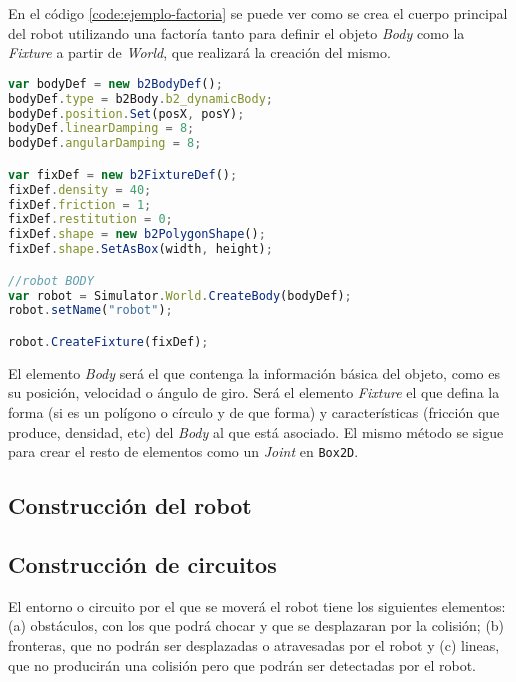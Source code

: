 En el código \ref{code:ejemplo-factoria} se puede ver como se crea el cuerpo principal del robot utilizando una factoría tanto para definir el objeto \emph{Body} como la \emph{Fixture} a partir de \emph{World}, que realizará la creación del mismo.

\begin{lstlisting}[language={Javascript},label={code:ejemplo-factoria}, caption={Creación del cuerpo principal del robot utilizando la librería Box2dweb.}]
var bodyDef = new b2BodyDef();
bodyDef.type = b2Body.b2_dynamicBody;
bodyDef.position.Set(posX, posY);
bodyDef.linearDamping = 8;
bodyDef.angularDamping = 8;

var fixDef = new b2FixtureDef();
fixDef.density = 40;
fixDef.friction = 1;
fixDef.restitution = 0;
fixDef.shape = new b2PolygonShape();
fixDef.shape.SetAsBox(width, height);

//robot BODY
var robot = Simulator.World.CreateBody(bodyDef);
robot.setName("robot");

robot.CreateFixture(fixDef);
\end{lstlisting}


El elemento \emph{Body} será el que contenga la información básica del objeto, como es su posición, velocidad o ángulo de giro. Será el elemento \emph{Fixture} el que defina la forma (si es un polígono o círculo y de que forma) y características (fricción que produce, densidad, etc) del \emph{Body} al que está asociado. El mismo método se sigue para crear el resto de elementos como un \emph{Joint} en \texttt{Box2D}.







\subsection{Construcción del robot}
\label{sec:contruccion-robot}

\subsection{Construcción de circuitos}
\label{sec:construccion-circuitos}


El entorno o circuito por el que se moverá el robot tiene los siguientes elementos: (a) obstáculos, con los que podrá chocar y que se desplazaran por la colisión; (b) fronteras, que no podrán ser desplazadas o atravesadas por el robot y (c) lineas, que no producirán una colisión pero que podrán ser detectadas por el robot. 


